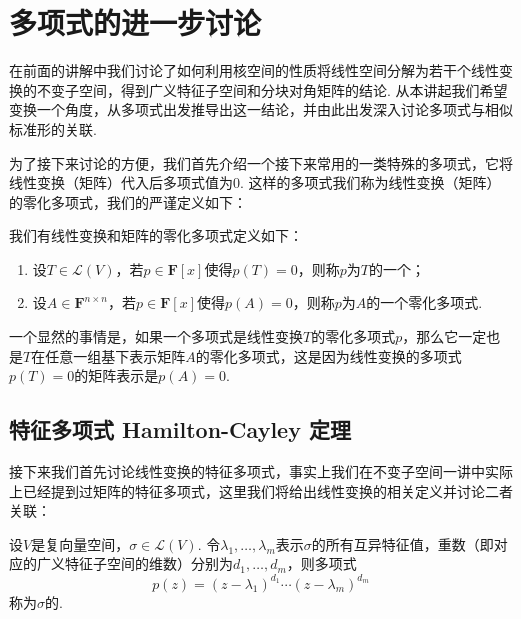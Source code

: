 \chapter{多项式的进一步讨论}

在前面的讲解中我们讨论了如何利用核空间的性质将线性空间分解为若干个线性变换的不变子空间，得到广义特征子空间和分块对角矩阵的结论. 从本讲起我们希望变换一个角度，从多项式出发推导出这一结论，并由此出发深入讨论多项式与相似标准形的关联.

为了接下来讨论的方便，我们首先介绍一个接下来常用的一类特殊的多项式，它将线性变换（矩阵）代入后多项式值为0. 这样的多项式我们称为线性变换（矩阵）的零化多项式，我们的严谨定义如下：
\begin{definition}[零化多项式] 
    我们有线性变换和矩阵的零化多项式定义如下：
    \begin{enumerate}
        \item 设$T\in \mathcal{L}(V)$，若$p\in\mathbf{F}[x]$使得$p(T)=0$，则称$p$为$T$的一个；

        \item 设$A\in\mathbf{F}^{n\times n}$，若$p\in\mathbf{F}[x]$使得$p(A)=0$，则称$p$为$A$的一个零化多项式.
    \end{enumerate}
\end{definition}

一个显然的事情是，如果一个多项式是线性变换$T$的零化多项式$p$，那么它一定也是$T$在任意一组基下表示矩阵$A$的零化多项式，这是因为线性变换的多项式$p(T)=0$的矩阵表示是$p(A)=0$.

\section{特征多项式 \quad Hamilton-Cayley 定理}

接下来我们首先讨论线性变换的特征多项式，事实上我们在不变子空间一讲中实际上已经提到过矩阵的特征多项式，这里我们将给出线性变换的相关定义并讨论二者关联：
\begin{definition}[特征多项式] 
    设$V$是复向量空间，$\sigma\in \mathcal{L}(V)$. 令$\lambda_1,\ldots,\lambda_m$表示$\sigma$的所有互异特征值，重数（即对应的广义特征子空间的维数）分别为$d_1,\ldots,d_m$，则多项式
    \begin{equation}\label{eq:21:线性变换特征多项式}
        p(z)=(z-\lambda_1)^{d_1}\cdots(z-\lambda_m)^{d_m}
    \end{equation}
    称为$\sigma$的.
\end{definition}

